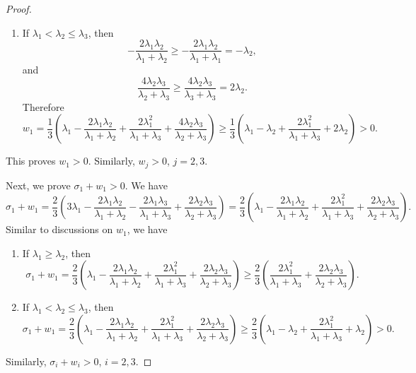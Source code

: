 \begin{proof}
\begin{enumerate}
\[      + \dfrac{4 \lambda_2 \lambda_3}{\lambda_2 + \lambda_3}\right)
    \geq \dfrac13\left(\dfrac{2 \lambda_1^2}{\lambda_1 + \lambda_3}
      + \dfrac{4 \lambda_2 \lambda_3}{\lambda_2 + \lambda_3}\right) > 0.
    \]
  \item If $\lambda_1 < \lambda_2 \leq \lambda_3$, then
    \[
    -\dfrac{2\lambda_1 \lambda_2}{\lambda_1 + \lambda_2}
    \geq -\dfrac{2\lambda_1 \lambda_2}{\lambda_1 + \lambda_1}
    = -\lambda_2,
    \]
    and
    \[
    \dfrac{4\lambda_2 \lambda_3}{\lambda_2 + \lambda_3} \geq
    \dfrac{4\lambda_2 \lambda_3}{\lambda_3 + \lambda_3}
    = 2\lambda_2.
    \]
    Therefore
    \[
    w_1 = \dfrac13\left(\lambda_1 - \dfrac{2\lambda_1 \lambda_2}
      {\lambda_1 + \lambda_2} + \dfrac{2 \lambda_1^2}{\lambda_1 + \lambda_3}
      + \dfrac{4 \lambda_2 \lambda_3}{\lambda_2 + \lambda_3}\right)
    \geq \dfrac13\left(\lambda_1 - \lambda_2 + 
      \dfrac{2 \lambda_1^2}{\lambda_1 + \lambda_3} + 2\lambda_2
    \right)
    > 0.
    \]
  \end{enumerate}
  This proves $w_1 > 0$. Similarly, $w_j > 0$, $j = 2,3$.

  Next, we prove $\sigma_1 + w_1 > 0$. We have
  \[
    \sigma_1 + w_1   = \dfrac23\left(3\lambda_1 - \dfrac{2\lambda_1 \lambda_2}
      {\lambda_1 + \lambda_2} - \dfrac{2\lambda_1 \lambda_3}
      {\lambda_1 + \lambda_3} + \dfrac{2 \lambda_2 \lambda_3}
    {\lambda_2 + \lambda_3} \right)
    = \dfrac23\left(\lambda_1 - 
      \dfrac{2\lambda_1 \lambda_2}{\lambda_1 + \lambda_2}
      + \dfrac{2\lambda_1^2}{\lambda_1 + \lambda_3} + 
      \dfrac{2\lambda_2 \lambda_3}{\lambda_2 + \lambda_3}
    \right).
  \]
  Similar to discussions on $w_1$, we have
  \begin{enumerate}
  \item If $\lambda_1 \geq \lambda_2$, then
    \[
    \sigma_1 + w_1 =   \dfrac23\left(\lambda_1 - 
      \dfrac{2\lambda_1 \lambda_2}{\lambda_1 + \lambda_2}
      + \dfrac{2\lambda_1^2}{\lambda_1 + \lambda_3} + 
      \dfrac{2\lambda_2 \lambda_3}{\lambda_2 + \lambda_3}
    \right)
    \geq 
    \dfrac23\left(\dfrac{2\lambda_1^2}{\lambda_1 + \lambda_3} + 
      \dfrac{2\lambda_2 \lambda_3}{\lambda_2 + \lambda_3}
    \right).
    \]
  \item If $\lambda_1 < \lambda_2 \leq \lambda_3$, then
    \[
    \sigma_1 + w_1 = \dfrac23\left(\lambda_1 - 
      \dfrac{2\lambda_1 \lambda_2}{\lambda_1 + \lambda_2}
      + \dfrac{2\lambda_1^2}{\lambda_1 + \lambda_3} + 
      \dfrac{2\lambda_2 \lambda_3}{\lambda_2 + \lambda_3}
    \right)
    \geq \dfrac23\left(\lambda_1 - \lambda_2 + 
      \dfrac{2 \lambda_1^2}{\lambda_1 + \lambda_3} + \lambda_2
    \right)
    > 0.
    \]
  \end{enumerate}
  Similarly, $\sigma_i + w_i > 0$, $i = 2,3$.
\end{proof}


